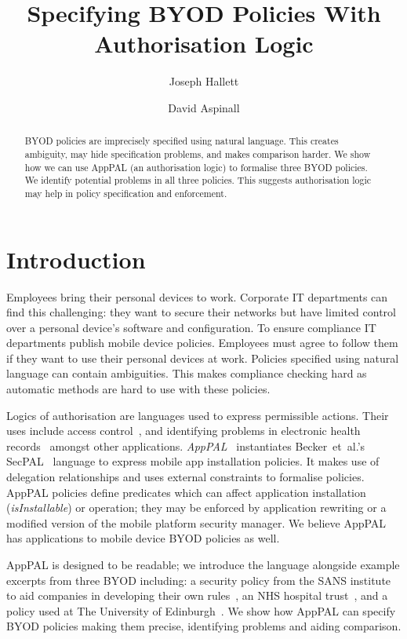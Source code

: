 \documentclass{easychair}
\title{Specifying BYOD Policies With Authorisation Logic}
\author{
  Joseph Hallett%
  \and
  David Aspinall%
}
\institute{
  University of Edinburgh
}
\begin{document}
\maketitle

\begin{abstract}
  BYOD policies are imprecisely specified using natural language.
  This creates ambiguity, may hide specification problems, and makes comparison harder.
  We show how we can use AppPAL (an authorisation logic) to formalise three BYOD policies.
  We identify potential problems in all three policies.
  This suggests authorisation logic may help in policy specification and enforcement.
\end{abstract}

\section{Introduction}

Employees bring their personal devices to work.
Corporate IT departments can find this challenging:
  they want to secure their networks but have limited control over a personal device's software and configuration.
To ensure compliance IT departments publish mobile device policies.
Employees must agree to follow them if they want to use their personal devices at work.
Policies specified using natural language can contain ambiguities.
This makes compliance checking hard as automatic methods are hard to use with these policies.

Logics of authorisation are languages used to express permissible actions.
Their uses include access control~\cite{Abadi:2003kta}, and identifying problems in electronic health records~\cite{Becker:2004fi} amongst other applications.
\emph{AppPAL}~\cite{Hallett:2016vu} instantiates Becker~et~al{.}'s SecPAL~\cite{Becker:2006vh} language to express mobile app installation policies.
It makes use of delegation relationships and uses external constraints to formalise policies.
AppPAL policies define predicates which can affect application installation (\emph{isInstallable}) or operation;
 they may be enforced by application rewriting or a modified version of the mobile platform security manager.
We believe AppPAL has applications to mobile device BYOD policies as well.

AppPAL is designed to be readable; we introduce the language alongside example excerpts from three BYOD including:
    a security policy from the SANS institute to aid companies in developing their own rules~\cite{Guerin:2008we}, 
    an NHS hospital trust~\cite{Kennington:2014tr},
    and a policy used at The University of Edinburgh~\cite{Williamson:2015tr}.
We show how AppPAL can specify BYOD policies making them precise, identifying problems and aiding comparison.
\end{document}
